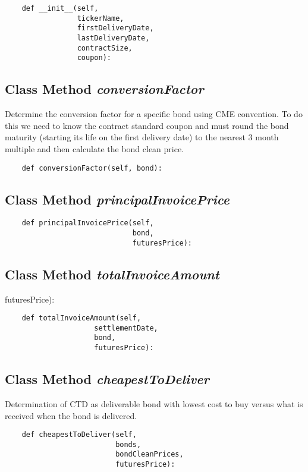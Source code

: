 \documentclass[twoside,11pt]{book}
\begin{document}
\begin{lstlisting}
    def __init__(self,
                 tickerName,
                 firstDeliveryDate, 
                 lastDeliveryDate, 
                 contractSize, 
                 coupon):
\end{lstlisting}

\subsection{Class Method {\it conversionFactor}}
Determine the conversion factor for a specific bond using CME convention. To do this we need to know the contract standard coupon and must round the bond maturity (starting its life on the first delivery date) to the nearest 3 month multiple and then calculate the bond clean price.  

\begin{lstlisting}
    def conversionFactor(self, bond):
\end{lstlisting}

\subsection{Class Method {\it principalInvoicePrice}}


\begin{lstlisting}
    def principalInvoicePrice(self,
                              bond,
                              futuresPrice):
\end{lstlisting}

\subsection{Class Method {\it totalInvoiceAmount}}
futuresPrice):

\begin{lstlisting}
    def totalInvoiceAmount(self,
                     settlementDate,
                     bond,
                     futuresPrice):
\end{lstlisting}

\subsection{Class Method {\it cheapestToDeliver}}
Determination of CTD as deliverable bond with lowest cost to buy versus what is received when the bond is delivered. 

\begin{lstlisting}
    def cheapestToDeliver(self, 
                          bonds,
                          bondCleanPrices,
                          futuresPrice):
\end{lstlisting}
\end{document}
